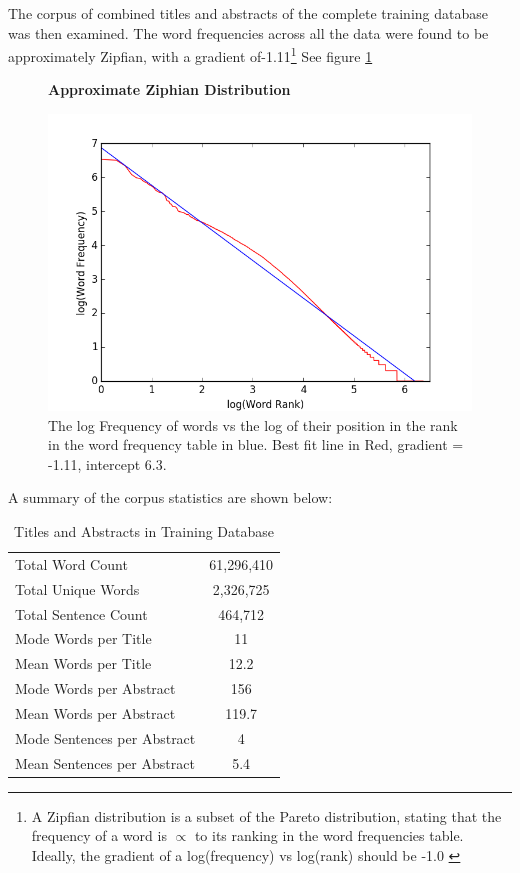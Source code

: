 The corpus of combined titles and abstracts of the complete training database was then examined. The word frequencies across all the data were found to be approximately Zipfian, with a gradient of-1.11\footnote{A Zipfian distribution is a subset of the Pareto distribution, stating that the frequency of a word is $\propto$ to its ranking in the word frequencies table. Ideally, the gradient of a log(frequency) vs log(rank) should be -1.0 \cite{zipf}} See figure \ref{fig:ZIPF}
\begin{figure}[H]
    \centering
    \textbf{Approximate Ziphian Distribution}\par\medskip
    \includegraphics[scale=0.4]{Data_Acquisition/zipf.png}
    \caption{The log Frequency of words vs the log of their position in the rank in the word frequency table in blue. Best fit line in Red, gradient = -1.11, intercept 6.3. }
     \label{fig:ZIPF}
\end{figure}
A summary of the corpus statistics are shown below:
\begin{table}[h!]
\label{tab:CORPUS STATS}
\caption{Titles and Abstracts in Training Database}
\begin{center}
\begin{tabular}{||l|c||}
\hline
Total Word Count & 61,296,410\\
Total Unique Words & 2,326,725\\
Total Sentence Count & 464,712\\
Mode Words per Title &  11\\
Mean Words per Title &  12.2\\
Mode Words per Abstract & 156\\
Mean Words per Abstract & 119.7\\
Mode Sentences per Abstract & 4\\
Mean Sentences per Abstract & 5.4\\
\hline
\end{tabular}
\end{center}
\end{table}

\label{sec:SCRAPEANALYSIS}
